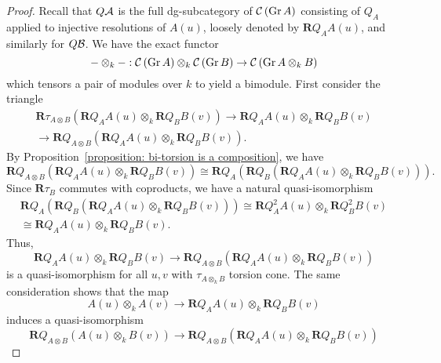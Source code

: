 \begin{proof}
  Recall that \(Q \mathcal{A}\) is the full dg-subcategory of \(\mathcal{C}\left(\operatorname{Gr}A\right)\) consisting of \(Q_{A}\) applied to injective resolutions of \(A(u)\), loosely denoted by \(\mathbf{R}Q_A A(u)\), and similarly for \(Q \mathcal{B}\). We have the exact functor
  \begin{displaymath}
    - \otimes_k - : \mathcal{C}\left(\operatorname{Gr}A\right) \otimes_k \mathcal{C}\left(\operatorname{Gr}B\right) \to \mathcal{C}\left(\operatorname{Gr}A \otimes_k B\right)
  \end{displaymath}
  which tensors a pair of modules over \(k\) to yield a bimodule. First consider the triangle
  \begin{gather*}
    \mathbf{R}\tau_{A \otimes B} (\mathbf{R} Q_A A(u) \otimes_k \mathbf{R} Q_B B(v) ) \to \mathbf{R} Q_A A(u) \otimes_k \mathbf{R} Q_B B(v) \\ \to \mathbf{R}Q_{A \otimes B} (\mathbf{R} Q_A A(u) \otimes_k \mathbf{R} Q_B B(v) ).
  \end{gather*}
  By Proposition~\ref{proposition: bi-torsion is a composition}, we have 
  \begin{displaymath}
    \mathbf{R}Q_{A \otimes B} (\mathbf{R} Q_A A(u) \otimes_k \mathbf{R} Q_B B(v) ) \cong \mathbf{R} Q_A \left( \mathbf{R}Q_B \left( \mathbf{R} Q_A A(u) \otimes_k \mathbf{R} Q_B B(v) \right) \right).
  \end{displaymath}
  Since \(\mathbf{R}\tau_B\) commutes with coproducts, we have a natural quasi-isomorphism
  \begin{gather*}
    \mathbf{R} Q_A \left( \mathbf{R}Q_B \left( \mathbf{R} Q_A A(u) \otimes_k \mathbf{R} Q_B B(v) \right) \right) \cong \mathbf{R}Q_A^2 A(u) \otimes_k \mathbf{R}Q_B^2 B(v) \\ \cong \mathbf{R}Q_A A(u) \otimes_k \mathbf{R}Q_B B(v). 
  \end{gather*}
  Thus, 
  \begin{displaymath}
    \mathbf{R} Q_A A(u) \otimes_k \mathbf{R} Q_B B(v) \to \mathbf{R}Q_{A \otimes B} (\mathbf{R} Q_A A(u) \otimes_k \mathbf{R} Q_B B(v) )
  \end{displaymath}
  is a quasi-isomorphism for all \(u,v\) with \(\tau_{A \otimes_k B}\) torsion cone. The same consideration shows that the map 
  \begin{displaymath}
    A(u) \otimes_k A(v) \to \mathbf{R} Q_A A(u) \otimes_k \mathbf{R} Q_B B(v)
  \end{displaymath}
  induces a quasi-isomorphism
  \begin{displaymath}
    \mathbf{R}Q_{A \otimes B}( A(u) \otimes_k B(v) ) \to \mathbf{R}Q_{A \otimes B} (\mathbf{R} Q_A A(u) \otimes_k \mathbf{R} Q_B B(v) )

\end{displaymath}
\end{proof}
